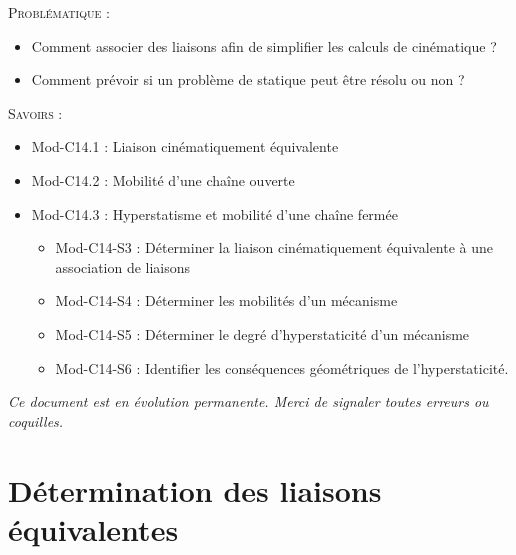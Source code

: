 \documentclass[10pt]{article}
\begin{document}
\begin{prob}
\textsc{Problématique :}
\begin{itemize}
\item Comment associer des liaisons afin de simplifier les calculs de cinématique ?
\item Comment prévoir si un problème de statique peut être résolu ou non ?
\end{itemize}
\end{prob}

\begin{savoir}
\textsc{Savoirs :}
\begin{itemize}
\item Mod-C14.1 : Liaison cinématiquement équivalente
\item Mod-C14.2 : Mobilité d’une chaîne ouverte
\item Mod-C14.3 : Hyperstatisme et mobilité d’une chaîne fermée
\begin{itemize}
\item Mod-C14-S3 : Déterminer la liaison cinématiquement équivalente à une association de liaisons
\item Mod-C14-S4 : Déterminer les mobilités d’un mécanisme
\item Mod-C14-S5 : Déterminer le degré d’hyperstaticité d’un mécanisme
\item Mod-C14-S6 : Identifier les conséquences géométriques de l’hyperstaticité.
\end{itemize}
\end{itemize}
\end{savoir}

\setlength{\parskip}{0ex plus 0.2ex minus 0ex}
 \renewcommand{\contentsname}{}
 \renewcommand{\baselinestretch}{1}

\tableofcontents

 \renewcommand{\baselinestretch}{1.2}
\setlength{\parskip}{2ex plus 0.5ex minus 0.2ex}

\textit{Ce document est en évolution permanente. Merci de signaler toutes
erreurs ou coquilles.}

\section{Détermination des liaisons équivalentes}
\end{document}
